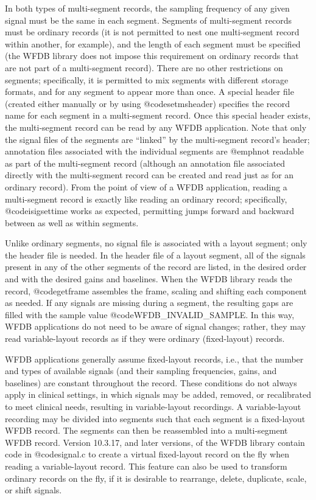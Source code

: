 {{{{{{{{{In both types of multi-segment records, the sampling frequency of any
given signal must be the same in each segment.  Segments of
multi-segment records must be ordinary records (it is not permitted to
nest one multi-segment record within another, for example), and the
length of each segment must be specified (the WFDB library does not
impose this requirement on ordinary records that are not part of a
multi-segment record).  There are no other restrictions on segments;
specifically, it is permitted to mix segments with different storage
formats, and for any segment to appear more than once.  A special
header file (created either manually or by using @code{setmsheader})
specifies the record name for each segment in a multi-segment record.
Once this special header exists, the multi-segment record can be read
by any WFDB application.  Note that only the signal files of the
segments are ``linked'' by the multi-segment record's header;
annotation files associated with the individual segments are
@emph{not} readable as part of the multi-segment record (although an
annotation file associated directly with the multi-segment record can
be created and read just as for an ordinary record).  From the point
of view of a WFDB application, reading a multi-segment record is
exactly like reading an ordinary record; specifically,
@code{isigsettime} works as expected, permitting jumps forward and
backward between as well as within segments.

Unlike ordinary segments, no signal file is associated with a layout segment;
only the header file is needed.  In the header file of a layout segment, all of
the signals present in any of the other segments of the record are listed, in
the desired order and with the desired gains and baselines.  When the WFDB
library reads the record, @code{getframe} assembles the frame, scaling and
shifting each component as needed.  If any signals are missing during a
segment, the resulting gaps are filled with the sample value
@code{WFDB_INVALID_SAMPLE}.  In this way, WFDB applications do not need to be
aware of signal changes; rather, they may read variable-layout records as if
they were ordinary (fixed-layout) records.

WFDB applications generally assume fixed-layout records, i.e., that
the number and types of available signals (and their sampling
frequencies, gains, and baselines) are constant throughout the record.
These conditions do not always apply in clinical settings, in which
signals may be added, removed, or recalibrated to meet clinical needs,
resulting in variable-layout recordings.  A variable-layout recording
may be divided into segments such that each segment is a fixed-layout
WFDB record.  The segments can then be reassembled into a
multi-segment WFDB record.  Version 10.3.17, and later versions, of
the WFDB library contain code in @code{signal.c} to create a virtual
fixed-layout record on the fly when reading a variable-layout record.
This feature can also be used to transform ordinary records on the fly, if
it is desirable to rearrange, delete, duplicate, scale, or shift
signals.

}}}}}}}}}

